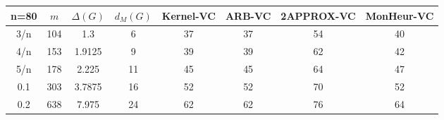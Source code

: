 \begin{tabular}{||c||ccc||cccc||}
 \hline \hline 
 n=80&$m$&$\Delta (G)$&$d_M(G)$& Kernel-VC & ARB-VC & 2APPROX-VC & MonHeur-VC\\ \hline \hline
3/n&104&1.3&6&37&37&54&40\\
4/n&153&1.9125&9&39&39&62&42\\
5/n&178&2.225&11&45&45&64&47\\
0.1&303&3.7875&16&52&52&70&52\\
0.2&638&7.975&24&62&62&76&64\\
\hline \end{tabular}

